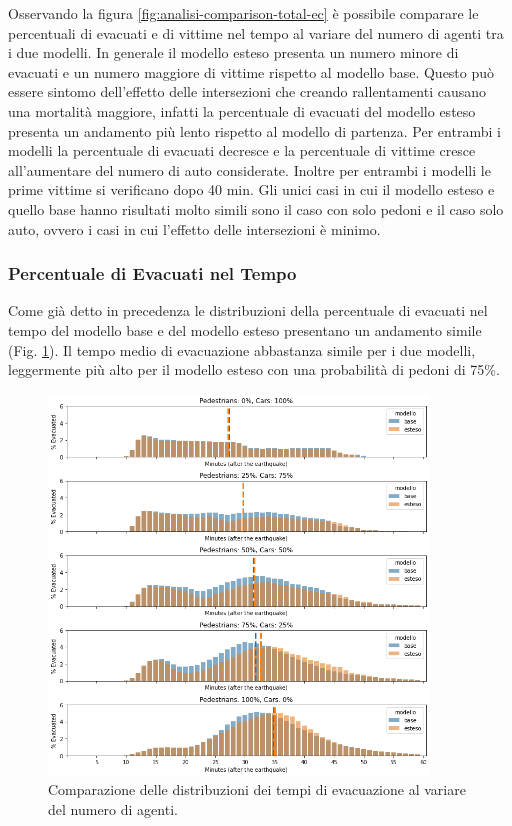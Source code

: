 Osservando la figura \ref{fig:analisi-comparison-total-ec} è possibile comparare le percentuali di evacuati e di vittime nel tempo al variare del numero di agenti tra i due modelli.
In generale il modello esteso presenta un numero minore di evacuati e un numero maggiore di vittime rispetto al modello base.
Questo può essere sintomo dell'effetto delle intersezioni che creando rallentamenti causano una mortalità maggiore,
infatti la percentuale di evacuati del modello esteso presenta un andamento più lento rispetto al modello di partenza.
Per entrambi i modelli la percentuale di evacuati decresce e la percentuale di vittime cresce all'aumentare del numero di auto considerate.
Inoltre per entrambi i modelli le prime vittime si verificano dopo 40 min.
Gli unici casi in cui il modello esteso e quello base hanno risultati molto simili sono il caso con solo pedoni e il caso solo auto, 
ovvero i casi in cui l'effetto delle intersezioni è minimo.

\pagebreak

\subsubsection*{Percentuale di Evacuati nel Tempo}

Come già detto in precedenza le distribuzioni della percentuale di evacuati nel tempo del modello base e del modello esteso 
presentano un andamento simile (Fig. \ref{fig:analisi-comparison-evtimes}). Il tempo medio di evacuazione abbastanza simile per i due modelli,
leggermente più alto per il modello esteso con una probabilità di pedoni di 75\%.

\begin{figure}[ht]
    \centering
    \includegraphics[width=0.9\textwidth]{images/analisi/comparison-evtimes.png}
    \caption{Comparazione delle distribuzioni dei tempi di evacuazione al variare del numero di agenti.}
    \label{fig:analisi-comparison-evtimes}
\end{figure}

